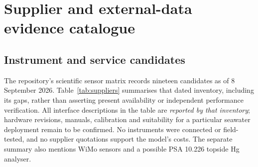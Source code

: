 \section{Supplier and external-data evidence catalogue}
\label{app:suppliers-data}

\subsection{Instrument and service candidates}

The repository's scientific sensor matrix records nineteen candidates as of 8 September 2026. Table~\ref{tab:suppliers} summarises that dated inventory, including its gaps, rather than asserting present availability or independent performance verification. All interface descriptions in the table are \emph{reported by that inventory}; hardware revisions, manuals, calibration and suitability for a particular seawater deployment remain to be confirmed. No instruments were connected or field-tested, and no supplier quotations support the model's costs. The separate summary also mentions WiMo sensors and a possible PSA 10.226 topside Hg analyser.\cite{repository}

